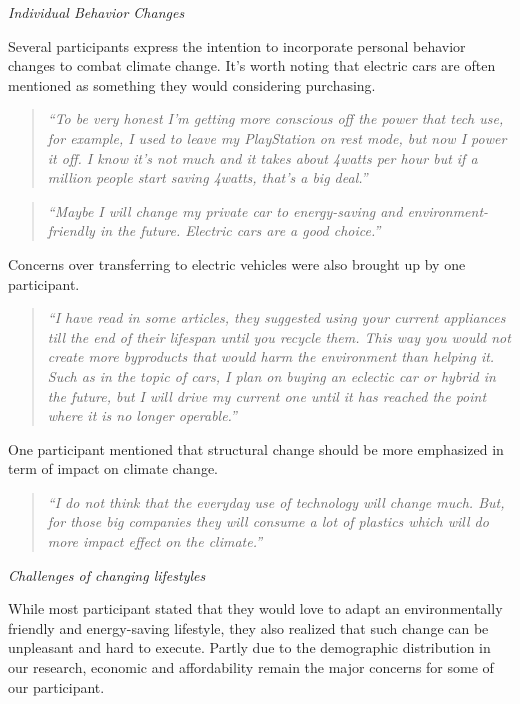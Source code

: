     \emph{Individual Behavior Changes}
    
    Several participants express the intention to incorporate personal behavior changes to combat climate change. It’s worth noting that electric cars are often mentioned as something they would considering purchasing.
    
    \begin{quote}
        \textit{“To be very honest I’m getting more conscious off the power that tech use, for example, I used to leave my PlayStation on rest mode, but now I power it off.  I know it’s not much and it takes about 4watts per hour but if a million people start saving 4watts, that’s a big deal.”}
    \end{quote}
    
    \begin{quote}
        \textit{“Maybe I will change my private car to energy-saving and environment-friendly in the future. Electric cars are a good choice.”}
    \end{quote}
    
    Concerns over transferring to electric vehicles were also brought up by one participant.

    \begin{quote}
        \textit{“I have read in some articles, they suggested using your current appliances till the end of their lifespan until you recycle them. This way you would not create more byproducts that would harm the environment than helping it. Such as in the topic of cars, I plan on buying an eclectic car or hybrid in the future, but I will drive my current one until it has reached the point where it is no longer operable.”}
    \end{quote}
    
    One participant mentioned that structural change should be more emphasized in term of impact on climate change.
    
    \begin{quote}
        \textit{“I do not think that the everyday use of technology will change much. But, for those big companies they will consume a lot of plastics which will do more impact effect on the climate.”}
    \end{quote}
    
    \emph{Challenges of changing lifestyles}
    
    While most participant stated that they would love to adapt an environmentally friendly and energy-saving lifestyle, they also realized that such change can be unpleasant and hard to execute. Partly due to the demographic distribution in our research, economic and affordability remain the major concerns for some of our participant. 
    
